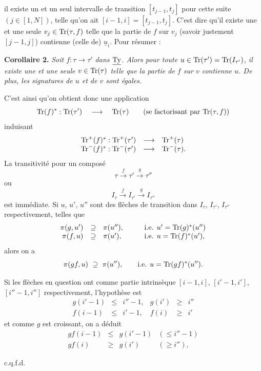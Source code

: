 il existe un et un seul intervalle de transition $[t_{j-1}, t_j]$ pour cette suite $(j \in [1, N])$, telle qu'on ait $[i-1, i] = [t_{j-1}, t_j]$. C'est dire qu'il existe une et une seule $v_j \in \mathrm{Tr}(\tau, f)$ telle que la partie de $f$ sur $v_j$ (savoir justement $[j-1, j]$) contienne (celle de) $\underline{u}_i$. Pour résumer :

\textbf{Corollaire 2.} \textit{Soit $f : \tau \longrightarrow \tau'$ dans $\underline{\mathrm{Ty}}$. Alors pour toute $u \in \mathrm{Tr}(\tau') = \mathrm{Tr}(I_{\tau'})$, il existe une et une seule $v \in \mathrm{Tr}(\tau)$ telle que la partie de $f$ sur $v$ contienne $u$. De plus, les signatures de $u$ et de $v$ sont égales.}

C'est ainsi qu'on obtient donc une application
\[
\mathrm{Tr}(f)^* : \mathrm{Tr}(\tau') \quad \longrightarrow \quad \mathrm{Tr}(\tau) \qquad (\text{se factorisant par } \mathrm{Tr}(\tau, f))
\]
induisant
\[
\begin{array}{rcl}
\mathrm{Tr}^+(f)^* : \mathrm{Tr}^+(\tau') & \longrightarrow & \mathrm{Tr}^+(\tau) \\
\mathrm{Tr}^-(f)^* : \mathrm{Tr}^-(\tau') & \longrightarrow & \mathrm{Tr}^-(\tau).
\end{array}
\]
La transitivité pour un composé
\[
\tau \xrightarrow{f} \tau' \xrightarrow{g} \tau''
\]
ou
\[
I_\tau \xrightarrow{f} I_{\tau'} \xrightarrow{g} I_{\tau''}
\]
est immédiate. Si $u$, $u'$, $u''$ sont des flèches de transition dans $I_\tau$, $I_{\tau'}$, $I_{\tau''}$ respectivement, telles que
\[
\begin{array}{rcll}
\pi(g, u') & \supseteq & \pi(u''), & \qquad \text{i.e. } u' = \mathrm{Tr}(g)^*(u'') \\
\pi(f, u) & \supseteq & \pi(u'), & \qquad \text{i.e. } u = \mathrm{Tr}(f)^*(u'),
\end{array}
\]
alors on a
\[
\pi(gf, u) \ \supseteq\ \pi(u''), \qquad \text{i.e. } u = \mathrm{Tr}(gf)^*(u'').
\]

Si les flèches en question ont comme partie intrinsèque $[i-1, i]$, $[i'-1, i']$, $[i''-1, i'']$ respectivement, l'hypothèse est
\[
\begin{array}{rclrcl}
g(i'-1) & \leq & i''-1, & g(i') & \geq & i'' \\
f(i-1) & \leq & i'-1, & f(i) & \geq & i'
\end{array}
\]
et comme $g$ est croissant, on a déduit
\[
\begin{array}{rcll}
gf(i-1) & \leq & g(i'-1) & (\leq i''-1) \\
gf(i) & \geq & g(i') & (\geq i''),
\end{array}
\]
\begin{flushright}
c.q.f.d.
\end{flushright}

